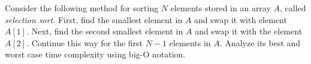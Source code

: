 \problem{}
Consider the following method for sorting $N$ elements stored in an array $A$, called \emph{selection sort}.  First, find the smallest element in $A$ and swap it with element  $A[1]$.  Next, find the second smallest element in $A$ and swap it with the element $A[2]$. Continue this way for the first $N-1$ elements in $A$. Analyze its best and worst case time complexity using big-O notation.

\solution{

}


\newpage